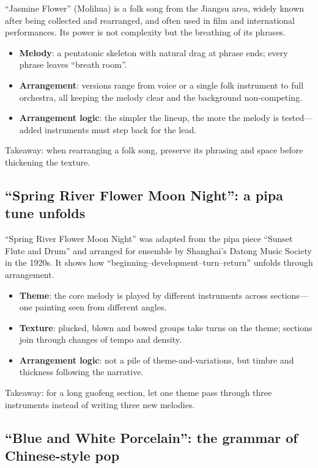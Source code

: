 ``Jasmine Flower'' (Molihua) is a folk song from the Jiangsu area, widely known after being collected and rearranged, and often used in film and international performances. Its power is not complexity but the breathing of its phrases.

\begin{itemize}
\item \textbf{Melody}: a pentatonic skeleton with natural drag at phrase ends; every phrase leaves ``breath room''.
\item \textbf{Arrangement}: versions range from voice or a single folk instrument to full orchestra, all keeping the melody clear and the background non-competing.
\item \textbf{Arrangement logic}: the simpler the lineup, the more the melody is tested---added instruments must step back for the lead.
\end{itemize}

Takeaway: when rearranging a folk song, preserve its phrasing and space before thickening the texture.

\subsection{``Spring River Flower Moon Night'': a pipa tune unfolds}
\label{sec:guofeng-case-spring-river}

``Spring River Flower Moon Night'' was adapted from the pipa piece ``Sunset Flute and Drum'' and arranged for ensemble by Shanghai's Datong Music Society in the 1920s. It shows how ``beginning--development--turn--return'' unfolds through arrangement.

\begin{itemize}
\item \textbf{Theme}: the core melody is played by different instruments across sections---one painting seen from different angles.
\item \textbf{Texture}: plucked, blown and bowed groups take turns on the theme; sections join through changes of tempo and density.
\item \textbf{Arrangement logic}: not a pile of theme-and-variations, but timbre and thickness following the narrative.
\end{itemize}

Takeaway: for a long guofeng section, let one theme pass through three instruments instead of writing three new melodies.

\subsection{``Blue and White Porcelain'': the grammar of Chinese-style pop}
\label{sec:guofeng-case-blue-and-white}

